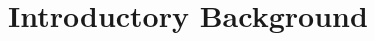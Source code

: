 \documentclass[12pt,a4paper]{article}
\begin{document}
\pagebreak 
\tableofcontents
\pagebreak

%
%
%
%

\section{Introductory Background}
\end{document}
